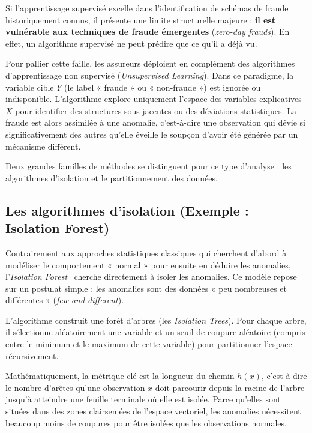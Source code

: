 Si l'apprentissage supervisé excelle dans l'identification de schémas de fraude historiquement connus, il présente une limite structurelle majeure : \textbf{il est vulnérable aux techniques de fraude émergentes} (\textit{zero-day frauds}). En effet, un algorithme supervisé ne peut prédire que ce qu'il a déjà vu.

Pour pallier cette faille, les assureurs déploient en complément des algorithmes d'apprentissage non supervisé (\textit{Unsupervised Learning}). Dans ce paradigme, la variable cible $Y$ (le label « fraude » ou « non-fraude ») est ignorée ou indisponible. L'algorithme explore uniquement l'espace des variables explicatives $X$ pour identifier des structures sous-jacentes ou des déviations statistiques. La fraude est alors assimilée à une anomalie, c'est-à-dire une observation qui dévie si significativement des autres qu'elle éveille le soupçon d'avoir été générée par un mécanisme différent.

Deux grandes familles de méthodes se distinguent pour ce type d'analyse : les algorithmes d'isolation et le partitionnement des données.

\subsection{Les algorithmes d'isolation (Exemple : Isolation Forest)}

Contrairement aux approches statistiques classiques qui cherchent d'abord à modéliser le comportement « normal » pour ensuite en déduire les anomalies, l'\textit{Isolation Forest}~\cite{liu_isolation_forest} cherche directement à isoler les anomalies. Ce modèle repose sur un postulat simple : les anomalies sont des données « peu nombreuses et différentes » (\textit{few and different}).

L'algorithme construit une forêt d'arbres (les \textit{Isolation Trees}). Pour chaque arbre, il sélectionne aléatoirement une variable et un seuil de coupure aléatoire (compris entre le minimum et le maximum de cette variable) pour partitionner l'espace récursivement.

Mathématiquement, la métrique clé est la longueur du chemin $h(x)$, c'est-à-dire le nombre d'arêtes qu'une observation $x$ doit parcourir depuis la racine de l'arbre jusqu'à atteindre une feuille terminale où elle est isolée. Parce qu'elles sont situées dans des zones clairsemées de l'espace vectoriel, les anomalies nécessitent beaucoup moins de coupures pour être isolées que les observations normales.

